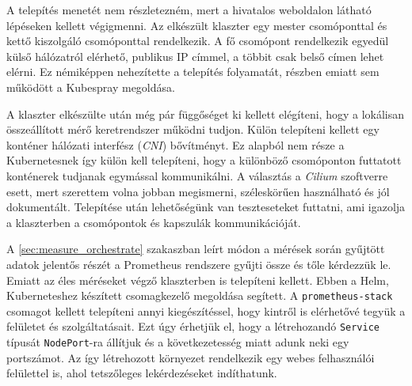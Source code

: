 A telepítés menetét nem részletezném, mert a hivatalos weboldalon\citep{kubeadmInstallCluster} látható lépéseken kellett végigmenni. 
Az elkészült klaszter egy mester csomóponttal és kettő kiszolgáló csomóponttal rendelkezik.
A fő csomópont rendelkezik egyedül külső hálózatról elérhető, publikus IP címmel, a többit csak belső címen lehet elérni.
Ez némiképpen nehezítette a telepítés folyamatát, részben emiatt sem működött a Kubespray megoldása. 

A klaszter elkészülte után még pár függőséget ki kellett elégíteni, hogy a lokálisan összeállított mérő keretrendszer működni tudjon.
Külön telepíteni kellett egy konténer hálózati interfész (\textit{CNI}) bővítményt.
Ez alapból nem része a Kubernetesnek így külön kell telepíteni, hogy a különböző csomóponton futtatott konténerek tudjanak egymással kommunikálni.
A választás a \textit{Cilium} szoftverre esett, mert szerettem volna jobban megismerni, széleskörűen használható és jól dokumentált.
Telepítése után lehetőségünk van teszteseteket futtatni, ami igazolja a klaszterben a csomópontok és kapszulák kommunikációját. 

A \ref{sec:measure_orchestrate} szakaszban leírt módon a mérések során gyűjtött adatok jelentős részét a Prometheus rendszere gyűjti össze és tőle kérdezzük le. 
Emiatt az éles méréseket végző klaszterben is telepíteni kellett. 
Ebben a Helm, Kuberneteshez készített csomagkezelő megoldása segített. 
A \verb+prometheus-stack+ csomagot kellett telepíteni annyi kiegészítéssel, hogy kintről is elérhetővé tegyük a felületet és szolgáltatásait. 
Ezt úgy érhetjük el, hogy a létrehozandó \verb+Service+  típusát \verb+NodePort+-ra állítjuk és a következetesség miatt adunk neki egy portszámot. 
Az így létrehozott környezet rendelkezik egy webes felhasználói felülettel is, ahol tetszőleges lekérdezéseket indíthatunk. 


